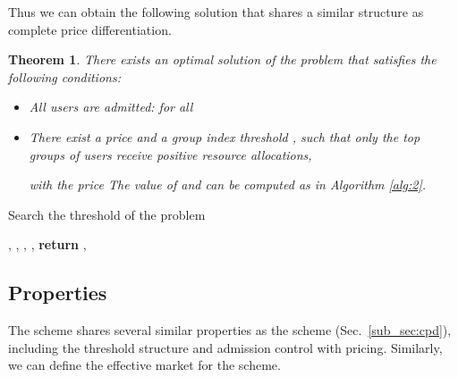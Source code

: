 \documentclass[twocolumn,10pt,twosided]{IEEEtran}
\newtheorem{theorem}{Theorem}
\begin{document}
Thus we can obtain the following solution that shares a similar structure as complete price differentiation.
\begin{theorem}\label{thm:sp}
There exists an optimal solution of the  problem that satisfies the following conditions:
\begin{itemize}
    \item All users are admitted:  for all 
    \item There exist a price  and a group index threshold , such that only the top  groups of users receive positive resource allocations,

with the price
  The value of  and  can be computed as in Algorithm \ref{alg:2}.
\end{itemize}
\end{theorem}

\begin{algorithm}[htb]                     \caption{Search the threshold of the  problem}     \label{alg:2}
\begin{algorithmic}[1]
 \Function {} {, }
    \State , 
    \While {}
        \State , 
    \EndWhile
    \State , 
    \State \textbf{return} , 
\EndFunction
\end{algorithmic}                       \end{algorithm}

\subsection{Properties}
\label{sub_sp}
The  scheme shares several similar properties as
the  scheme (Sec.~\ref{sub_sec:cpd}), including the threshold structure and admission control with pricing. Similarly, we can define the effective market for the  scheme.
\end{document}
